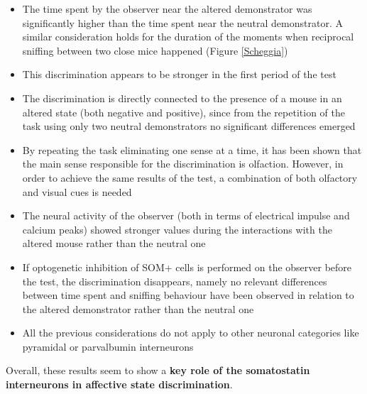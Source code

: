 \documentclass[12pt, a4paper]{report}
\begin{document}
 \begin{itemize}
 	
 	\item The time spent by the observer near the altered demonstrator was significantly higher than the time spent near the neutral demonstrator. A similar consideration holds for the duration of the moments when reciprocal sniffing between two close mice happened (Figure \ref{Scheggia})
 	
 	\item This  discrimination appears to be stronger in the first period of the test
 	
 	\item The discrimination is directly connected to the presence of a mouse in an altered state (both negative and positive), since from the repetition of the task using only two neutral demonstrators no significant differences emerged
 	
 	\item By repeating the task eliminating one sense at a time, it has been shown that the main sense responsible for the discrimination is olfaction. However, in order to achieve the same results of the test, a combination of both olfactory and visual cues is needed
 	
 	
 	\item The neural activity of the observer (both in terms of electrical impulse and  calcium peaks) showed stronger values during the interactions with the altered mouse rather than the neutral one
 	
 	\item If optogenetic inhibition of SOM+ cells \cite{41} is
 	performed on the observer before the test, the discrimination disappears, namely no relevant differences between time spent and sniffing behaviour have been observed in relation to the altered demonstrator rather than the neutral one
 	
 	
 	\item All the previous considerations do not apply to other neuronal categories like pyramidal or parvalbumin interneurons
 	 
 \end{itemize}
 
 Overall, these results seem to show a \textbf{key role of the somatostatin interneurons in affective state discrimination}.
\end{document}
